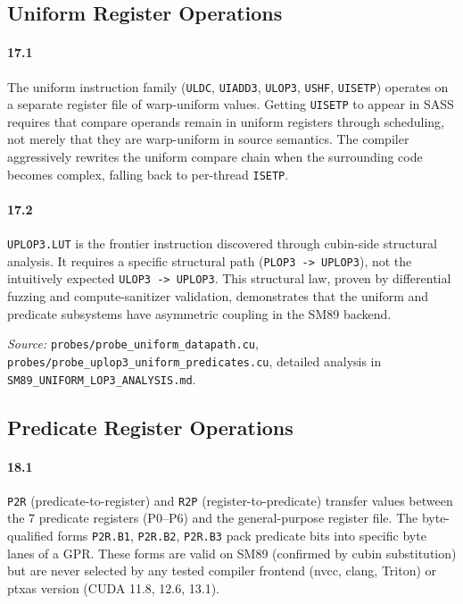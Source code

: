 \subsection{Uniform Register Operations}
\label{par:uniform}

\paragraph{17.1}
The uniform instruction family (\texttt{ULDC}, \texttt{UIADD3},
\texttt{ULOP3}, \texttt{USHF}, \texttt{UISETP}) operates on a separate
register file of warp-uniform values.  Getting \texttt{UISETP} to appear
in SASS requires that compare operands remain in uniform registers through
scheduling, not merely that they are warp-uniform in source semantics.
The compiler aggressively rewrites the uniform compare chain when the
surrounding code becomes complex, falling back to per-thread \texttt{ISETP}.

\paragraph{17.2}
\texttt{UPLOP3.LUT} is the frontier instruction discovered through
cubin-side structural analysis.  It requires a specific structural path
(\texttt{PLOP3 -> UPLOP3}), not the intuitively expected
\texttt{ULOP3 -> UPLOP3}.  This structural law, proven by differential
fuzzing and compute-sanitizer validation, demonstrates that the uniform
and predicate subsystems have asymmetric coupling in the SM89 backend.

\textit{Source:} \texttt{probes/probe\_uniform\_datapath.cu},
\texttt{probes/probe\_uplop3\_uniform\_predicates.cu},
detailed analysis in \texttt{SM89\_UNIFORM\_LOP3\_ANALYSIS.md}.

\subsection{Predicate Register Operations}
\label{par:predicate}

\paragraph{18.1}
\texttt{P2R} (predicate-to-register) and \texttt{R2P}
(register-to-predicate) transfer values between the 7 predicate registers
(P0--P6) and the general-purpose register file.  The byte-qualified forms
\texttt{P2R.B1}, \texttt{P2R.B2}, \texttt{P2R.B3} pack predicate bits into
specific byte lanes of a GPR.  These forms are valid on SM89 (confirmed by
cubin substitution) but are never selected by any tested compiler frontend
(nvcc, clang, Triton) or ptxas version (CUDA 11.8, 12.6, 13.1).

